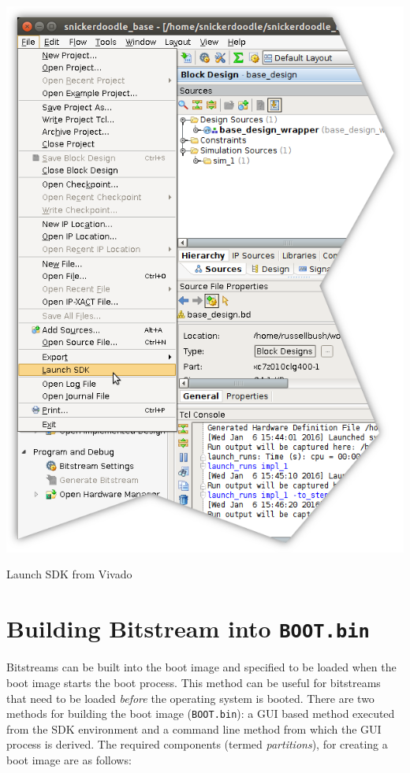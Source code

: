 \begin{marginfigure}
	\centering
	\includegraphics{images/Launch_SDK.png}
	\caption[Launch SDK from Vivado]{Launch SDK from Vivado}
	\label{fig:launchsdk}
\end{marginfigure}


\section{Building Bitstream into \texttt{BOOT.bin}}
Bitstreams can be built into the boot image and specified to be loaded when the boot image starts the boot process. This method can be useful for bitstreams that need to be loaded \textit{before} the operating system is booted. There are two methods for building the boot image (\texttt{BOOT.bin}): a GUI based method executed from the SDK environment and a command line method from which the GUI process is derived. The required components (termed \textit{partitions}), for creating a boot image are as follows:

